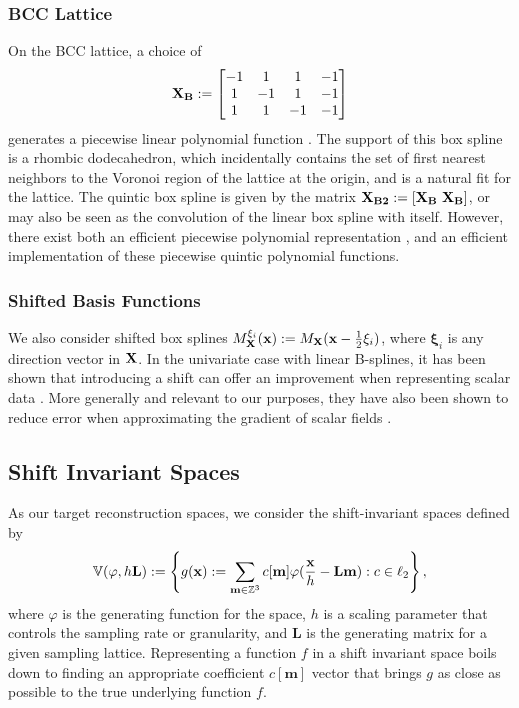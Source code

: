 \subsubsection{BCC Lattice}
On the BCC lattice, a choice of {\footnotesize
\begin{equation*}
	\mathbf{\mathbf{X}_{B}} := 
	\begin{bmatrix} 
		-1 & 1 & 1 & -1 \\
		1 & -1 & 1 & -1 \\
		1 & 1 & -1 & -1 
	\end{bmatrix}
\end{equation*}}
generates a piecewise linear polynomial function \cite{practicalbox}. The support of this box spline is a rhombic dodecahedron, which incidentally contains the set of first nearest neighbors to the Voronoi region of the lattice at the origin, and is a natural fit for the lattice. The quintic box spline is given by the matrix $\mathbf{\mathbf{X}_{B2}} := \left[\mathbf{\mathbf{X}_{B}} \ \mathbf{\mathbf{X}_{B}}\right]$, or may also be seen as the convolution of the linear box spline with itself.  However, there exist both an efficient piecewise polynomial representation \cite{practicalbox}, and an efficient implementation \cite{fastbox} of these piecewise quintic polynomial functions.

\subsubsection{Shifted Basis Functions}
We also consider shifted box splines $M_{\mathbf{\mathbf{X}}}^{\xi_i}(\mathbf{x}) := M_{\mathbf{\mathbf{X}}}(\mathbf{x} - \frac{1}{2}\mathbf{\xi}_i)$, where $\mathbf{\xi}_i$ is any direction vector in $\mathbf{\mathbf{X}}$. In the univariate case with linear B-splines, it has been shown that introducing a shift can offer an improvement when representing scalar data \cite{linearrev}. More generally and relevant to our purposes, they have also been shown to reduce error when approximating the gradient of scalar fields \cite{gradrev}.

\subsection{Shift Invariant Spaces} \label{sec:sis_review}
As our target reconstruction spaces, we consider the shift-invariant spaces defined by {\small 
\begin{equation*}
	\mathbb{V}(\varphi, h\mathbf{L}) := \left\{ g(\mathbf{x}) := \displaystyle\sum_{\mathbf{m} \in \mathbb{Z}^3} c[\mathbf{m}]\varphi(\frac{\mathbf{x}}{h} - \mathbf{Lm}) : c \in \ell_2 \right\},
\end{equation*}}
where $\varphi$ is the generating function for the space, $h$ is a scaling parameter that controls the sampling rate or granularity, and $\mathbf{L}$ is the generating matrix for a given sampling lattice. Representing a function $f$ in a shift invariant space boils down to finding an appropriate coefficient $c[\mathbf{m}]$ vector that brings $g$ as close as possible to the true underlying function $f$. 

